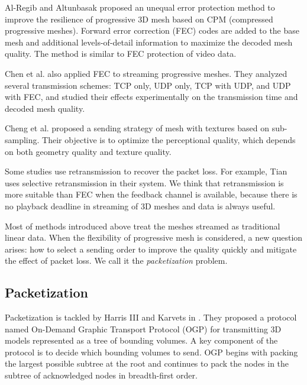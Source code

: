    Al-Regib and Altunbasak \cite{unequal:Al-Regib} proposed an
    unequal error protection method to improve the resilience of
    progressive 3D mesh based on CPM (compressed progressive meshes). 
    Forward error correction (FEC) codes are added to the
    base mesh and additional levels-of-detail information to maximize 
    the decoded mesh quality.  The method is similar to FEC protection 
    of video data.

    Chen et al. \cite{chen05hybrid} also applied FEC to streaming
    progressive meshes. They analyzed several transmission schemes:
    TCP only, UDP only, TCP with UDP, and UDP with FEC, and studied
    their effects experimentally on the transmission time and decoded
    mesh quality.

    Cheng et al. \cite{loss:cheng} proposed a sending strategy of mesh
    with textures based on sub-sampling. 
    Their objective is to optimize the perceptional quality, which depends 
    on both geometry quality and texture quality. 
    
    Some studies use retransmission to recover the packet loss.
    For example, Tian \cite{Tian2006} uses selective retransmission in their system.
    We think that retransmission is more suitable than FEC when the feedback
    channel is available, because there is no playback deadline in streaming
    of 3D meshes and data is always useful.

    Most of methods introduced above treat the meshes streamed as 
    traditional linear data. When the flexibility of progressive mesh
    is considered, a new question arises: how to select a sending order
    to improve the quality quickly and mitigate the effect of packet loss.
    We call it the \emph{packetization} problem.
    
    \subsection{Packetization}
    \label{ss:intro:packetization}
    Packetization is tackled by
    Harris III and Karvets in \cite{harris:design}.   
    They proposed a protocol named On-Demand Graphic Transport Protocol (OGP)
    for transmitting 3D models represented as a tree of bounding volumes.
    A key component of the protocol is to decide which bounding volumes
    to send.  OGP begins with packing the largest possible subtree at
    the root and continues to pack the nodes in the subtree of
    acknowledged nodes in breadth-first order.  
    
